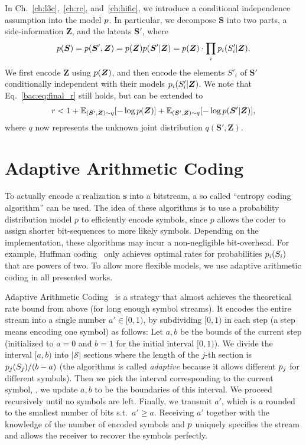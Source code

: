 In Ch.~\ref{ch:l3c},~\ref{ch:rc}, and~\ref{ch:hific}, we introduce a conditional independence assumption 
into the model $p$. In particular, we decompose $\bm S$ into two parts, a side-information $\bm Z$, and the latents $\bm S'$, where 
\begin{align*}
    p(\bm S)=p(\bm S', \bm Z)=p(\bm Z) p(\bm S'|\bm Z) = 
    p(\bm Z) \cdot \prod_i p_i(S'_i | \bm Z).
\end{align*}
We first encode $\bm Z$ using $p(\bm Z)$, and then encode the elements
$S'_i$ of $\bm S'$ conditionally independent with their models $p_i(S'_i | \bm Z)$.
We note that Eq.~\ref{bac:eq:final_r} still holds, but can be extended to
\begin{align}
    r < 1 + \mathbb{E}_{(\bm S', \bm Z) \sim q}[-\log p(\bm Z)]
          + \mathbb{E}_{(\bm S', \bm Z) \sim q}[-\log p(\bm S' | \bm Z)],
\end{align}
where $q$ now represents the unknown joint distribution $q(\bm S', \bm Z)$.


\section{Adaptive Arithmetic Coding} \label{bac:sec:aac}

To actually encode a realization $\bm s$ into a bitstream, a so called
``entropy coding algorithm'' can be used. The idea of these algorithms
is to use a probability distribution model $p$ to efficiently encode
symbols, since $p$ allows the coder to assign shorter bit-sequences
to more likely symbols. Depending on the implementation,
these algorithms may incur a non-negligible bit-overhead. For example, Huffman
coding~\cite{huffman1952method} only achieves optimal rates for probabilities
$p_i(S_i)$ that are powers of two. To allow more flexible models, we
use adaptive arithmetic coding in all presented works.

Adaptive Arithmetic Coding~\cite{witten1987arithmetic} is a strategy that almost
achieves the theoretical rate bound from above (for long enough symbol streams).
It encodes the entire stream into a single number $a' \in [0, 1)$, by
subdividing $[0, 1)$ in each step (a step means encoding one symbol) as follows: Let $a, b$
be the bounds of the current step (initialized to $a=0$ and $b=1$ for the
initial interval $[0,1)$). We divide the interval $[a, b)$ into $|\mathcal S|$ sections
where the length of the $j$-th section is $p_j(S_j) / (b-a)$
(the algorithms is called \emph{adaptive} because it allows different $p_j$
for different symbols).
Then we pick the
interval corresponding to the current symbol, \ie, we update $a, b$ to be the
boundaries of this interval. We proceed recursively until no symbols are left.
Finally, we transmit $a'$, which is $a$ rounded to the smallest number of bits
s.t.\ $a' \ge a$. Receiving $a'$ together with the knowledge of the number of
encoded symbols and $p$ uniquely specifies the stream and allows the
receiver to recover the symbols perfectly.

